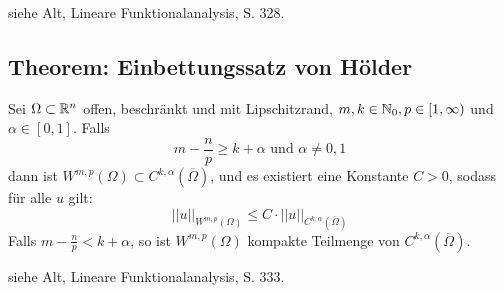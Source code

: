 	siehe Alt, \glqq Lineare Funktionalanalysis\grqq, S. 328.
	
\subsection{Theorem: Einbettungssatz von Hölder}
\label{thm:hoelder_einbettung} \label{thm_63}
	Sei $\Omega \subset \mathbb{R}^n$ offen, beschränkt und mit Lipschitzrand, $m, k \in \mathbb{N}_0, p \in [1,\infty)$ und $\alpha \in [0,1]$. Falls \marginnote{[63]}
	\[ m - \frac{n}{p} \geq k + \alpha \text{ und } \alpha \neq 0,1 \]
	dann ist $W^{m,p}(\Omega) \subset C^{k,\alpha}(\overline{\Omega})$, und es existiert eine Konstante $C > 0$, sodass für alle $u$ gilt:
	\[ ||u||_{W^{m,p}(\Omega)} \leq C \cdot ||u||_{C^{k,\alpha}(\overline{\Omega})} \]
	Falls $m - \frac{n}{p} < k + \alpha$, so ist $W^{m,p}(\Omega)$ kompakte Teilmenge von $C^{k,\alpha}(\overline{\Omega})$.
	
	siehe Alt, \glqq Lineare Funktionalanalysis\grqq, S. 333.

\newpage